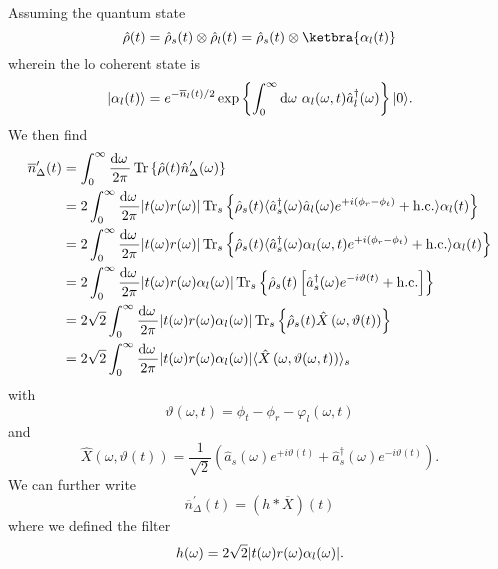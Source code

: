 Assuming the quantum state~\cite[p.~213]{Vogel2006}
\begin{equation}
	\hat\rho(t)
	=
	\hat\rho_s(t)
	\otimes
	\hat\rho_l(t)
	=
	\hat\rho_s(t)
	\otimes
	\ketbra{\alpha_l(t)}
\end{equation}
wherein the \gls{lo} coherent state is
\begin{equation}
	\ket{\alpha_l(t)}
	=
	e^{-\overline{n}_l(t)/2}
	\exp\left\{
		\int_0^\infty\dd{\omega}
		\alpha_l(\omega,t)
		\hat{a}_l^\dagger(\omega)
	\right\}
	\ket{0}
	.
\end{equation}
We then find
\begin{equation}
	\begin{split}
		\overline{n}^\prime_\Delta(t)
		&=
		\int_0^\infty\frac{\dd{\omega}}{2\pi}
		\trace\left\{
			\hat\rho(t)
			\hat{n}_\Delta^\prime(\omega)
		\right\}
		\\
		&=
		2
		\int_0^\infty\frac{\dd{\omega}}{2\pi}
		\abs{t(\omega)r(\omega)}
		\trace_s\left\{
			\hat\rho_s(t)
			\expval{
				\hat{a}_s^\dagger(\omega)
				\hat{a}_l(\omega)
				e^{+i(\phi_r-\phi_t)}
				+
				\text{h.c.}
			}{\alpha_l(t)}
		\right\}
		\\
		&=
		2
		\int_0^\infty\frac{\dd{\omega}}{2\pi}
		\abs{t(\omega)r(\omega)}
		\trace_s\left\{
			\hat\rho_s(t)
			\expval{
				\hat{a}_s^\dagger(\omega)
				\alpha_l(\omega,t)
				e^{+i(\phi_r-\phi_t)}
				+
				\text{h.c.}
			}{\alpha_l(t)}
		\right\}
		\\
		&=
		2
		\int_0^\infty\frac{\dd{\omega}}{2\pi}
		\abs{t(\omega)r(\omega)\alpha_l(\omega)}
		\trace_s\left\{
			\hat\rho_s(t)
			\left[
				\hat{a}_s^\dagger(\omega)
				e^{-i\vartheta(t)}
				+
				\text{h.c.}
			\right]
		\right\}
		\\
		&=
		2\sqrt{2}
		\int_0^\infty\frac{\dd{\omega}}{2\pi}
		\abs{t(\omega)r(\omega)\alpha_l(\omega)}
		\trace_s\left\{
			\hat\rho_s(t)
			\hat{X}\left(\omega,\vartheta(t)\right)
		\right\}
		\\
		&=
		2\sqrt{2}
		\int_0^\infty\frac{\dd{\omega}}{2\pi}
		\abs{t(\omega)r(\omega)\alpha_l(\omega)}
		\expval{\hat{X}\left(\omega,\vartheta(\omega,t)\right)}_s
	\end{split}
\end{equation}
with
\begin{equation}
	\vartheta(\omega,t)
	=
	\phi_t-\phi_r-\varphi_l(\omega,t)
\end{equation}
and
\begin{equation}
	\hat{X}\left(\omega,\vartheta(t)\right)
	=
	\frac{1}{\sqrt{2}}
	\left(
		\hat{a}_s(\omega)
		e^{+i\vartheta(t)}
		+
		\hat{a}_s^\dagger(\omega)
		e^{-i\vartheta(t)}
	\right)
	.
\end{equation}
We can further write
\begin{equation}
	\overline{n}^\prime_\Delta(t)
	=
	\left(h*\overline{X}\right)(t)
\end{equation}
where we defined the filter
\begin{equation}
	h(\omega)
	=
	2\sqrt{2}
	\lvert t(\omega)r(\omega)\alpha_l(\omega)\rvert
	.
\end{equation}


